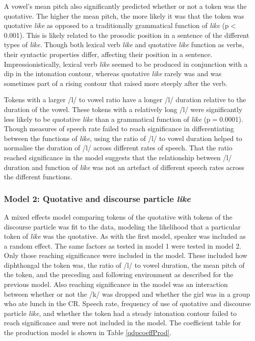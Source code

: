 A vowel's mean pitch also significantly predicted whether or not a token was the quotative.  The higher the mean pitch, the more likely it was that the token was quotative \textit{like} as opposed to a traditionally grammatical function of \textit{like} (p$<$0.001).  This is likely related to the prosodic position in a sentence of the different types of \textit{like}.  Though both lexical verb \textit{like} and quotative \textit{like} function as verbs, their syntactic properties differ, affecting their position in a sentence.  Impressionistically, lexical verb \textit{like} seemed to be produced in conjunction with a dip in the intonation contour, whereas quotative \textit{like} rarely was and was sometimes part of a rising contour that raised more steeply after the verb.  

Tokens with a larger /l/ to vowel ratio have a longer /l/ duration relative to the duration of the vowel.  These tokens with a relatively long /l/ were significantly less likely to be quotative \textit{like} than a grammatical function of \textit{like} (p$=$0.0001).  Though measures of speech rate failed to reach significance in differentiating between the functions of \textit{like}, using the ratio of /l/ to vowel duration helped to normalise the duration of /l/ across different rates of speech.  That the ratio reached significance in the model suggests that the relationship between /l/ duration and function of \textit{like} was not an artefact of different speech rates across the different functions.    



\subsubsection{Model 2: Quotative and discourse particle \textit{like}}

A mixed effects model comparing tokens of the quotative with tokens of the discourse particle was fit to the data, modeling the likelihood that a particular token of \textit{like} was the quotative.    As with the first model, speaker was included as a random effect.  The same factors as tested in model 1 were tested in model 2.  Only those reaching significance were included in the model.    These included how diphthongal the token was, the ratio of /l/ to vowel duration, the mean pitch of the token, and the preceding and following environment as described for the previous model.  Also reaching significance in the model was an interaction between whether or not the /k/ was dropped and whether the girl was in a group who ate lunch in the CR.  Speech rate, frequency of use of quotative and discourse particle \textit{like}, and whether the token had a steady intonation contour failed to reach significance and were not included in the model.  The coefficient table for the production model is shown in Table \ref{qdpcoeffProd}.  
 
